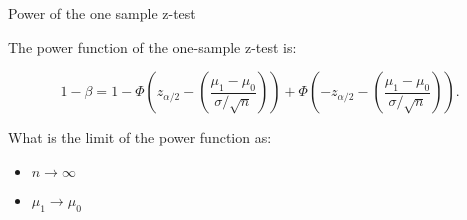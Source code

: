 \documentclass[ignorenonframetext,]{beamer}
\begin{document}
\begin{frame}{Power of the one sample z-test}

The power function of the one-sample z-test is:

\[ 1-\beta=1-\Phi\left( z_{\alpha/2}-\left(\frac{\mu_1-\mu_0}{\sigma/\sqrt{n}}\right) \right)+\Phi\left( -z_{\alpha/2}-\left(\frac{\mu_1-\mu_0}{\sigma/\sqrt{n}}\right) \right).\]

What is the limit of the power function as:

\begin{itemize}
\item $n \rightarrow \infty$ \\
\item $\mu_1 \rightarrow \mu_0$ \\
\end{itemize}

\end{frame}
\end{document}
